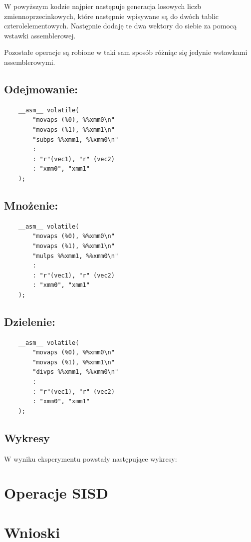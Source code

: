 \documentclass{article}
\begin{document}
W powyższym kodzie najpier następuje generacja losowych liczb zmiennoprzecinkowych, które następnie wpisywane są do dwóch tablic 
czterolelementowych. Następnie dodaję te dwa wektory do siebie za pomocą wstawki assemblerowej.

Pozostałe operacje są robione w taki sam sposób różniąc się jedynie wstawkami assemblerowymi.

\subsection{Odejmowanie:}

\begin{verbatim}
    __asm__ volatile(
        "movaps (%0), %%xmm0\n"
        "movaps (%1), %%xmm1\n"
        "subps %%xmm1, %%xmm0\n" 
        :                       
        : "r"(vec1), "r" (vec2)
        : "xmm0", "xmm1" 
    );
\end{verbatim}

\subsection{Mnożenie:}

\begin{verbatim}
    __asm__ volatile(
        "movaps (%0), %%xmm0\n"
        "movaps (%1), %%xmm1\n"
        "mulps %%xmm1, %%xmm0\n" 
        :                       
        : "r"(vec1), "r" (vec2)
        : "xmm0", "xmm1" 
    );
\end{verbatim}

\subsection{Dzielenie:}

\begin{verbatim}
    __asm__ volatile(
        "movaps (%0), %%xmm0\n"
        "movaps (%1), %%xmm1\n"
        "divps %%xmm1, %%xmm0\n" 
        :                       
        : "r"(vec1), "r" (vec2)
        : "xmm0", "xmm1" 
    );
\end{verbatim}

\subsection{Wykresy}

W wyniku eksperymentu powstały następujące wykresy:



\section{Operacje SISD}

\section{Wnioski}
\end{document}
